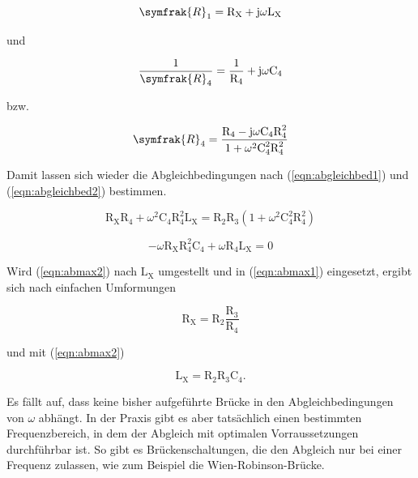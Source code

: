 \begin{equation}
\symfrak{R}_1= \text{R}_\text{X}+\text{j} \omega \text{L}_\text{X}
\end{equation}

\noindent
und

\begin{equation}
\frac{1}{\symfrak{R}_4}= \frac{1}{\text{R}_4}+\text{j} \omega \text{C}_4
\end{equation}

\noindent
bzw.

\begin{equation}
\symfrak{R}_4 = \frac{\text{R}_4 - \text{j} \omega \text{C}_4 \text{R}_4^2}{1 + \omega^2 \text{C}_4^2 \text{R}_4^2}
\end{equation}

\noindent
Damit lassen sich wieder die Abgleichbedingungen nach (\ref{eqn:abgleichbed1}) und (\ref{eqn:abgleichbed2}) bestimmen.

\begin{equation}
\text{R}_\text{X} \text{R}_4 + \omega^2 \text{C}_4 \text{R}_4^2 \text{L}_\text{X} = \text{R}_2 \text{R}_3 (1 + \omega^2 \text{C}_4^2 \text{R}_4^2)
\label{eqn:abmax1}
\end{equation}

\begin{equation}
- \omega \text{R}_\text{X} \text{R}_4^2 \text{C}_4 + \omega \text{R}_4 \text{L}_\text{X} = 0
\label{eqn:abmax2}
\end{equation}

\noindent
Wird (\ref{eqn:abmax2}) nach $\text{L}_\text{X}$ umgestellt und in (\ref{eqn:abmax1}) eingesetzt, ergibt sich nach einfachen Umformungen

\begin{equation}
\text{R}_\text{X} = \text{R}_2 \frac{\text{R}_3}{\text{R}_4}
\end{equation}

\noindent
und mit (\ref{eqn:abmax2}) 

\begin{equation}
\text{L}_\text{X} = \text{R}_2 \text{R}_3 \text{C}_4   .
\end{equation}

\noindent
Es fällt auf, dass keine bisher aufgeführte Brücke in den Abgleichbedingungen von $\omega$ abhängt.
In der Praxis gibt es aber tatsächlich einen bestimmten Frequenzbereich, in dem der Abgleich mit optimalen Vorraussetzungen durchführbar ist.
So gibt es Brückenschaltungen, die den Abgleich nur bei einer Frequenz zulassen, wie zum Beispiel die Wien-Robinson-Brücke.

